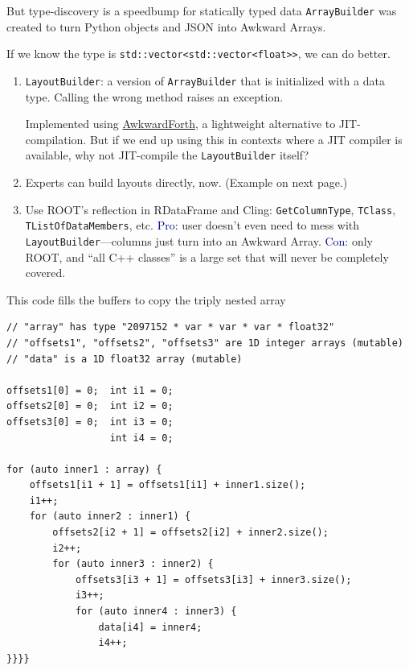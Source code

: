 \documentclass[aspectratio=169]{beamer}
\begin{document}
\begin{frame}{But type-discovery is a speedbump for statically typed data}
\vspace{0.35 cm}
\texttt{ArrayBuilder} was created to turn Python objects and JSON into Awkward Arrays.

\vspace{0.25 cm}
If we know the type is \texttt{std::vector<std::vector<float>>}, we can do better.

\vspace{0.25 cm}
\begin{enumerate}\setlength{\itemsep}{0.3 cm}
\item<2-> \texttt{LayoutBuilder}: a version of \texttt{ArrayBuilder} that is initialized with a data type. Calling the wrong method raises an exception.

\vspace{0.2 cm}
Implemented using \textcolor{blue}{\href{https://arxiv.org/abs/2102.13516}{AwkwardForth}}, a lightweight alternative to JIT-compilation. But if we end up using this in contexts where a JIT compiler is available, why not JIT-compile the \texttt{LayoutBuilder} itself?

\item<3-> Experts can build layouts directly, now. (Example on next page.)

\item<4-> Use ROOT's reflection in RDataFrame and Cling: \texttt{GetColumnType}, \texttt{TClass}, \texttt{TListOfDataMembers}, etc. \textcolor{darkblue}{Pro:} user doesn't even need to mess with \texttt{LayoutBuilder}---columns just turn into an Awkward Array. \textcolor{darkblue}{Con:} only ROOT, and ``all C++ classes'' is a large set that will never be completely covered.
\end{enumerate}
\end{frame}

\begin{frame}[fragile]{This code fills the buffers to copy the triply nested array}
\vspace{0.25 cm}
\scriptsize
\begin{verbatim}
// "array" has type "2097152 * var * var * var * float32"
// "offsets1", "offsets2", "offsets3" are 1D integer arrays (mutable)
// "data" is a 1D float32 array (mutable)

offsets1[0] = 0;  int i1 = 0;
offsets2[0] = 0;  int i2 = 0;
offsets3[0] = 0;  int i3 = 0;
                  int i4 = 0;

for (auto inner1 : array) {
    offsets1[i1 + 1] = offsets1[i1] + inner1.size();
    i1++;
    for (auto inner2 : inner1) {
        offsets2[i2 + 1] = offsets2[i2] + inner2.size();
        i2++;
        for (auto inner3 : inner2) {
            offsets3[i3 + 1] = offsets3[i3] + inner3.size();
            i3++;
            for (auto inner4 : inner3) {
                data[i4] = inner4;
                i4++;
}}}}
\end{verbatim}
\end{frame}
\end{document}
